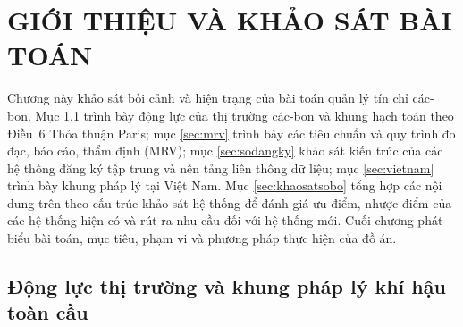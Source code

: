 
\chapter{GIỚI THIỆU VÀ KHẢO SÁT BÀI TOÁN}
\label{chap:khaosat}

Chương này khảo sát bối cảnh và hiện trạng của bài toán quản lý tín chỉ các-bon. Mục \ref{sec:dongluc} trình bày động lực của thị trường các-bon và khung hạch toán theo Điều~6 Thỏa thuận Paris; mục \ref{sec:mrv} trình bày các tiêu chuẩn và quy trình đo đạc, báo cáo, thẩm định (MRV); mục \ref{sec:sodangky} khảo sát kiến trúc của các hệ thống đăng ký tập trung và nền tảng liên thông dữ liệu; mục \ref{sec:vietnam} trình bày khung pháp lý tại Việt Nam. Mục \ref{sec:khaosatsobo} tổng hợp các nội dung trên theo cấu trúc khảo sát hệ thống để đánh giá ưu điểm, nhược điểm của các hệ thống hiện có và rút ra nhu cầu đối với hệ thống mới. Cuối chương phát biểu bài toán, mục tiêu, phạm vi và phương pháp thực hiện của đồ án.

\section{Động lực thị trường và khung pháp lý khí hậu toàn cầu}
\label{sec:dongluc}

